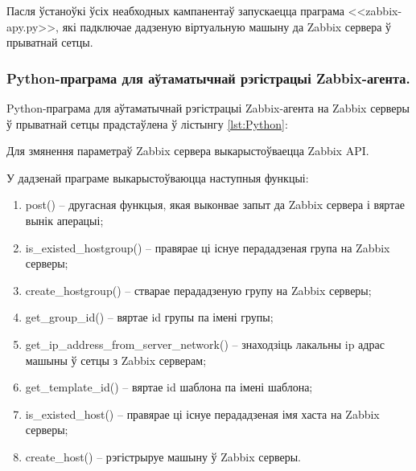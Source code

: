 Пасля ўстаноўкі ўсіх неабходных кампанентаў запускаецца праграма 
<<zabbix-apy.py>>, які падключае дадзеную віртуальную машыну да
Zabbix сервера ў прыватнай сетцы.

\subsubsection{Python-праграма для аўтаматычнай рэгістрацыі Zabbix-агента.}
Python-праграма для аўтаматычнай рэгістрацыі Zabbix-агента на Zabbix серверы ў
прыватнай сетцы прадстаўлена ў лістынгу
\ref{lst:Python}:



Для змянення параметраў Zabbix сервера выкарыстоўваецца Zabbix API.

У дадзенай праграме выкарыстоўваюцца наступныя функцыі:
\begin{enumerate}
    \item post() -- другасная функцыя, якая выконвае запыт да Zabbix сервера і вяртае вынік аперацыі;
    \item is\_existed\_hostgroup() -- правярае ці існуе перададзеная група на Zabbix серверы;
    \item create\_hostgroup() -- стварае перададзеную групу на Zabbix серверы;
    \item get\_group\_id() --  вяртае id групы па імені групы;
    \item get\_ip\_address\_from\_server\_network() -- знаходзіць лакальны ip адрас машыны ў сетцы з Zabbix серверам;
    \item get\_template\_id() --  вяртае id шаблона па імені шаблона;
    \item is\_existed\_host() -- правярае ці існуе перададзеная імя хаста на Zabbix серверы;
    \item create\_host() -- рэгістрыруе машыну ў Zabbix серверы.
\end{enumerate}
